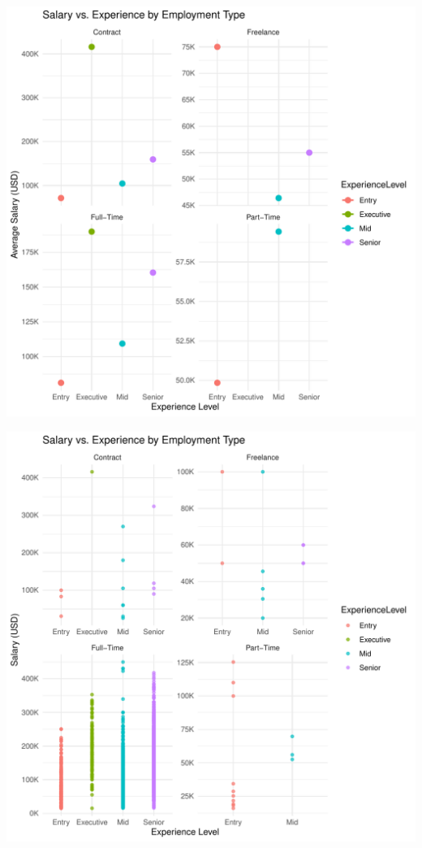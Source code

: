 \documentclass{article}\usepackage[]{graphicx}\usepackage[]{xcolor}
\makeatletter
\def\maxwidth{ %
  \ifdim\Gin@nat@width>\linewidth
    \linewidth
  \else
    \Gin@nat@width
  \fi
}
\newenvironment{knitrout}{}{} %
\makeatother
\begin{document}
\begin{knitrout}
\color{fgcolor}
\includegraphics[width=\maxwidth]{figure/unnamed-chunk-3-1} 
\end{knitrout}

\begin{knitrout}
\color{fgcolor}
\includegraphics[width=\maxwidth]{figure/unnamed-chunk-4-1} 
\end{knitrout}
\end{document}
